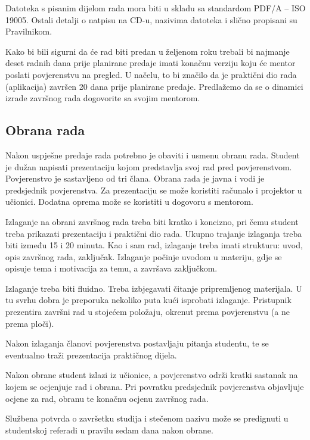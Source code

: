Datoteka s pisanim dijelom rada mora biti u skladu sa standardom PDF/A – ISO 19005. Ostali detalji o natpisu na CD-u, nazivima datoteka i slično propisani su Pravilnikom.

Kako bi bili sigurni da će rad biti predan u željenom roku trebali bi najmanje deset radnih dana prije planirane predaje imati konačnu verziju koju će mentor poslati povjerenstvu na pregled. U načelu, to bi značilo da je praktični dio rada (aplikacija) završen 20 dana prije planirane predaje. Predlažemo da se o dinamici izrade završnog rada dogovorite sa svojim mentorom.

\subsection{Obrana rada}
Nakon uspješne predaje rada potrebno je obaviti i usmenu obranu rada. Student je dužan napisati prezentaciju kojom predstavlja svoj rad pred povjerenstvom. Povjerenstvo je sastavljeno od tri člana. Obrana rada je javna i vodi je predsjednik povjerenstva. Za prezentaciju se može koristiti računalo i projektor u učionici. Dodatna oprema može se koristiti u dogovoru s mentorom.

Izlaganje na obrani završnog rada treba biti kratko i koncizno, pri čemu student treba prikazati prezentaciju i praktični dio rada. Ukupno trajanje izlaganja treba biti između 15 i 20 minuta. Kao i sam rad, izlaganje treba imati strukturu: uvod, opis završnog rada, zaključak. Izlaganje počinje uvodom u materiju, gdje se opisuje tema i motivacija za temu, a završava zaključkom.

Izlaganje treba biti fluidno. Treba izbjegavati čitanje pripremljenog materijala. U tu svrhu dobra je preporuka nekoliko puta kući isprobati izlaganje. Pristupnik prezentira završni rad u stojećem položaju, okrenut prema povjerenstvu (a ne prema ploči).

Nakon izlaganja članovi povjerenstva postavljaju pitanja studentu, te se eventualno traži prezentacija praktičnog dijela. 

Nakon obrane student izlazi iz učionice, a povjerenstvo održi kratki sastanak na kojem se ocjenjuje rad i obrana. Pri povratku predsjednik povjerenstva objavljuje ocjene za rad, obranu te konačnu ocjenu završnog rada. 

Službena potvrda o završetku studija i stečenom nazivu može se predignuti u studentskoj referadi u pravilu sedam dana nakon obrane.
